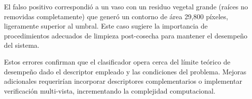 El falso positivo correspondió a un vaso con un residuo vegetal grande (raíces no removidas completamente) que generó un contorno de área 29,800 píxeles, ligeramente superior al umbral. Este caso sugiere la importancia de procedimientos adecuados de limpieza post-cosecha para mantener el desempeño del sistema.

Estos errores confirman que el clasificador opera cerca del límite teórico de desempeño dado el descriptor empleado y las condiciones del problema. Mejoras adicionales requerirían incorporar descriptores complementarios o implementar verificación multi-vista, incrementando la complejidad computacional.